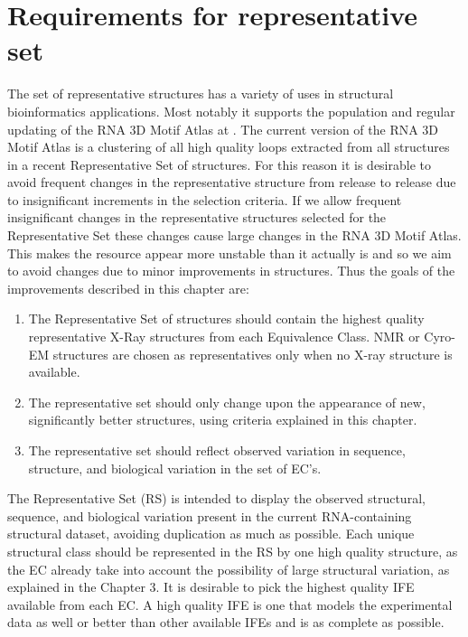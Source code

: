 \section{Requirements for representative set}

The set of representative structures has a variety of uses in structural
bioinformatics applications. Most notably it supports the population and regular
updating of the RNA 3D Motif Atlas at .
The current version of the RNA 3D Motif Atlas is a clustering of all high
quality loops extracted from all structures in a recent Representative Set of
structures. For this reason it is desirable to avoid frequent changes in the
representative structure from release to release due to insignificant increments
in the selection criteria. If we allow frequent insignificant changes in the
representative structures selected for the Representative Set these changes
cause large changes in the RNA 3D Motif Atlas. This makes the resource appear
more unstable than it actually is and so we aim to avoid changes due to minor
improvements in structures. Thus the goals of the improvements described in
this chapter are:

\begin{enumerate}
  \item The Representative Set of structures should contain the highest quality
    representative X-Ray structures from each Equivalence Class. NMR or Cyro-EM
    structures are chosen as representatives only when no X-ray structure is
    available.

  \item The representative set should only change upon the appearance of new,
    significantly better structures, using criteria explained in this chapter.

  \item The representative set should reflect observed variation in sequence,
    structure, and biological variation in the set of EC's.
\end{enumerate}

The Representative Set (RS) is intended to display the observed structural,
sequence, and biological variation present in the current RNA-containing
structural dataset, avoiding duplication as much as possible. Each unique
structural class should be represented in the RS by one high quality structure,
as the EC already take into account the possibility of large structural
variation, as explained in the Chapter 3. It is desirable to pick the highest
quality IFE available from each EC\@. A high quality IFE is one that models the
experimental data as well or better than other available IFEs and is as complete
as possible.

